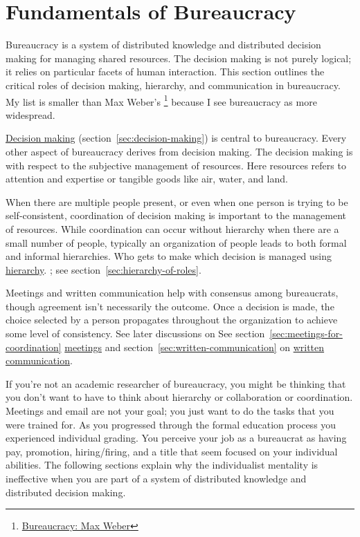 \section*{Fundamentals of Bureaucracy\label{sec:fundamentals-of-b}}
  
Bureaucracy is a system of distributed knowledge and distributed decision making for managing shared resources. The decision making is not purely logical; it relies on particular facets of human interaction. This section outlines the critical roles of decision making, hierarchy, and communication in bureaucracy. 
My list is smaller than Max Weber's \cite{2015_Weber}\footnote{\href{https://en.wikipedia.org/wiki/Bureaucracy\#Max_Weber}{Bureaucracy: Max Weber}} because I see bureaucracy as more widespread.

\hyperref[sec:decision-making]{Decision making}
\ifsectionref
(section~\ref{sec:decision-making}) 
\fi
is central to bureaucracy. Every other aspect of bureaucracy derives from decision making. The decision making is with respect to the subjective management of resources. Here resources refers to attention and expertise or tangible goods like air, water, and land. 

When there are multiple people present, or even when one person is trying to be self-consistent, coordination of decision making is important to the management of resources. While coordination can occur without hierarchy when there are a small number of people, typically an organization of people leads to both formal and informal hierarchies. Who gets to make which decision is managed using
\hyperref[sec:hierarchy-of-roles]{hierarchy}.
\ifsectionref
; see section~\ref{sec:hierarchy-of-roles}.
\fi

Meetings and written communication help with consensus among bureaucrats, though agreement isn't necessarily the outcome.
Once a decision is made, the choice selected by a person propagates throughout the organization to achieve some level of consistency. 
See later discussions on
\ifsectionref
See section~\ref{sec:meetings-for-coordination}
\fi
\hyperref[sec:meetings-for-coordination]{meetings} and 
\ifsectionref
section~\ref{sec:written-communication} on
\fi
\hyperref[sec:written-communication]{written communication}.

If you're not an academic researcher of bureaucracy, you might be thinking that you don't want to have to think about hierarchy or collaboration or coordination. Meetings and email are not your goal; you just want to do the tasks that you were trained for. As you progressed through the formal education process you experienced individual grading. You perceive your job as a bureaucrat as having pay, promotion, hiring/firing, and a title that  seem focused on your individual abilities. The following sections explain why the individualist mentality is ineffective when you are part of a system of distributed knowledge and distributed decision making. 



